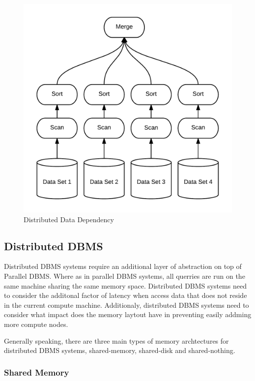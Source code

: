 \documentclass[10pt,twocolumn]{IEEEtran11}
\begin{document}
\begin{figure}[h]
\centering
\includegraphics[scale=0.12]{images/parDBMS.png}
\caption{Distributed Data Dependency}
\label{fig:disDBMS}
\end{figure}

\subsection{Distributed DBMS}

Distributed DBMS systems require an additional layer of abstraction on top of Parallel DBMS.  Where as in parallel DBMS systems, all querries are run on the same machine sharing the same memory space.  Distributed DBMS systems need to consider the additonal factor of latency when access data that does not reside in the current compute machine.  Additionaly, distributed DBMS systems need to consider what impact does the memory laytout have in preventing easily addming more compute nodes.  

Generally speaking, there are three main types of memory 
archtectures for distributed DBMS systems, shared-memory, shared-disk and shared-nothing.

\subsubsection{Shared Memory}
\end{document}
